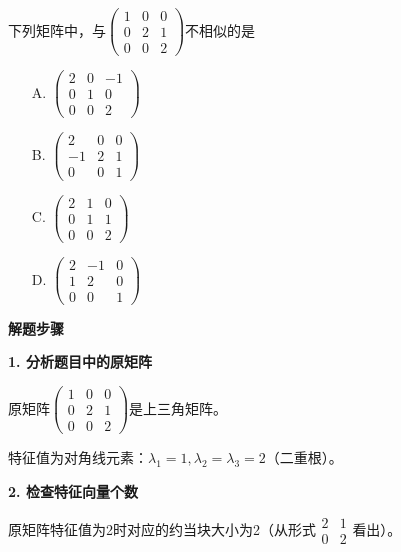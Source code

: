 \documentclass[standard]{ExBook}
\begin{document}
\begin{qitems}
    \begin{bbox}
        \qitem 下列矩阵中，与$\begin{pmatrix} 1 & 0 & 0 \\ 0 & 2 & 1 \\ 0 & 0 & 2 \end{pmatrix}$不相似的是
        \begin{itemize}
            \item[A.] $\begin{pmatrix} 2 & 0 & -1 \\ 0 & 1 & 0 \\ 0 & 0 & 2 \end{pmatrix}$
            \item[B.] $\begin{pmatrix} 2 & 0 & 0 \\ -1 & 2 & 1 \\ 0 & 0 & 1 \end{pmatrix}$
            \item[C.] $\begin{pmatrix} 2 & 1 & 0 \\ 0 & 1 & 1 \\ 0 & 0 & 2 \end{pmatrix}$
            \item[D.] $\begin{pmatrix} 2 & -1 & 0 \\ 1 & 2 & 0 \\ 0 & 0 & 1 \end{pmatrix}$
        \end{itemize}
        \begin{solution}
            \textbf{解题步骤}
            
            \textbf{1. 分析题目中的原矩阵}
            
            原矩阵$\begin{pmatrix} 1 & 0 & 0 \\ 0 & 2 & 1 \\ 0 & 0 & 2 \end{pmatrix}$是上三角矩阵。
            
            特征值为对角线元素：$\lambda_1=1, \lambda_2=\lambda_3=2$（二重根）。
            
            \textbf{2. 检查特征向量个数}
            
            原矩阵特征值为2时对应的约当块大小为2（从形式$\begin{smallmatrix} 2 & 1 \\ 0 & 2 \end{smallmatrix}$看出）。
            

\end{solution}
\end{bbox}
\end{qitems}
\end{document}
